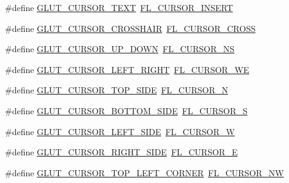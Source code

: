 \begin{DoxyCompactItemize}
\item 
\#define \hyperlink{glut_8_h_a639f8771f4ccdfb8f028c81d840f9d4f}{G\+L\+U\+T\+\_\+\+C\+U\+R\+S\+O\+R\+\_\+\+T\+E\+XT}~\hyperlink{_enumerations_8_h_a72bde974edc7926b1217dd51b8c7e8e0ab6031998169de52eadfda65d464cbefb}{F\+L\+\_\+\+C\+U\+R\+S\+O\+R\+\_\+\+I\+N\+S\+E\+RT}
\item 
\#define \hyperlink{glut_8_h_a34f28d1c6c7a9b566ed65760b7abe5f0}{G\+L\+U\+T\+\_\+\+C\+U\+R\+S\+O\+R\+\_\+\+C\+R\+O\+S\+S\+H\+A\+IR}~\hyperlink{_enumerations_8_h_a72bde974edc7926b1217dd51b8c7e8e0a69ff20b8685ba12b6faef9f7f2565c91}{F\+L\+\_\+\+C\+U\+R\+S\+O\+R\+\_\+\+C\+R\+O\+SS}
\item 
\#define \hyperlink{glut_8_h_a0348dfb00fee4e121ba0b9dbeb775883}{G\+L\+U\+T\+\_\+\+C\+U\+R\+S\+O\+R\+\_\+\+U\+P\+\_\+\+D\+O\+WN}~\hyperlink{_enumerations_8_h_a72bde974edc7926b1217dd51b8c7e8e0ab47413e34d7d268488a279b9f93d694b}{F\+L\+\_\+\+C\+U\+R\+S\+O\+R\+\_\+\+NS}
\item 
\#define \hyperlink{glut_8_h_a071ef1aafcf8d354a0418d1408ac344d}{G\+L\+U\+T\+\_\+\+C\+U\+R\+S\+O\+R\+\_\+\+L\+E\+F\+T\+\_\+\+R\+I\+G\+HT}~\hyperlink{_enumerations_8_h_a72bde974edc7926b1217dd51b8c7e8e0a1f084eec70809a1edc89031d97d754f6}{F\+L\+\_\+\+C\+U\+R\+S\+O\+R\+\_\+\+WE}
\item 
\#define \hyperlink{glut_8_h_a146e07be459e49d23b5f9de6d4d1e287}{G\+L\+U\+T\+\_\+\+C\+U\+R\+S\+O\+R\+\_\+\+T\+O\+P\+\_\+\+S\+I\+DE}~\hyperlink{_enumerations_8_h_a72bde974edc7926b1217dd51b8c7e8e0afc216f1424895e8a3ff70ee4d396a359}{F\+L\+\_\+\+C\+U\+R\+S\+O\+R\+\_\+N}
\item 
\#define \hyperlink{glut_8_h_af757d463504a3523d7bd485fc2d27297}{G\+L\+U\+T\+\_\+\+C\+U\+R\+S\+O\+R\+\_\+\+B\+O\+T\+T\+O\+M\+\_\+\+S\+I\+DE}~\hyperlink{_enumerations_8_h_a72bde974edc7926b1217dd51b8c7e8e0ae346bec5544ac09f2ac846f37fc802dd}{F\+L\+\_\+\+C\+U\+R\+S\+O\+R\+\_\+S}
\item 
\#define \hyperlink{glut_8_h_a304db09d1c4e39e7837d42ff8864c5f7}{G\+L\+U\+T\+\_\+\+C\+U\+R\+S\+O\+R\+\_\+\+L\+E\+F\+T\+\_\+\+S\+I\+DE}~\hyperlink{_enumerations_8_h_a72bde974edc7926b1217dd51b8c7e8e0a3e71103dc03ff53a2a53be5e7e4b19eb}{F\+L\+\_\+\+C\+U\+R\+S\+O\+R\+\_\+W}
\item 
\#define \hyperlink{glut_8_h_aee778fd5e4df79e02e4df89ff4a6e223}{G\+L\+U\+T\+\_\+\+C\+U\+R\+S\+O\+R\+\_\+\+R\+I\+G\+H\+T\+\_\+\+S\+I\+DE}~\hyperlink{_enumerations_8_h_a72bde974edc7926b1217dd51b8c7e8e0a655675f4a5c1009798c4688811f7aef8}{F\+L\+\_\+\+C\+U\+R\+S\+O\+R\+\_\+E}
\item 
\#define \hyperlink{glut_8_h_a189b7b54f88e48c838597695e80ee39c}{G\+L\+U\+T\+\_\+\+C\+U\+R\+S\+O\+R\+\_\+\+T\+O\+P\+\_\+\+L\+E\+F\+T\+\_\+\+C\+O\+R\+N\+ER}~\hyperlink{_enumerations_8_h_a72bde974edc7926b1217dd51b8c7e8e0a414ffb070f3fbcd0a97dafdaa6b718f7}{F\+L\+\_\+\+C\+U\+R\+S\+O\+R\+\_\+\+NW}

\end{DoxyCompactItemize}
